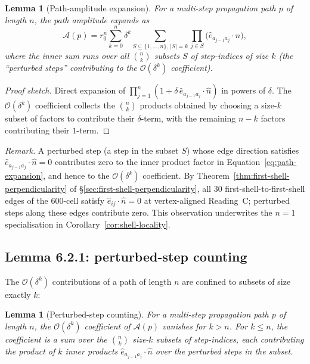 \documentclass[11pt,letterpaper]{article}
\newtheorem{lemma}[theorem]{Lemma}
\newcommand{\bigO}[1]{\mathcal{O}(#1)}
\begin{document}
\begin{lemma}[Path-amplitude expansion]
\label{lem:path-expansion}
For a multi-step propagation path $p$ of length $n$, the path amplitude expands as
\begin{equation}
\mathcal{A}(p) = r_0^n \sum_{k=0}^{n} \delta^k \sum_{S \subseteq \{1, \ldots, n\}, \, |S| = k} \prod_{j \in S} \big(\hat{e}_{a_{j-1} a_j} \cdot \hat{n}\big),
\label{eq:path-expansion}
\end{equation}
where the inner sum runs over all $\binom{n}{k}$ subsets $S$ of step-indices of size $k$ (the ``perturbed steps'' contributing to the $\bigO{\delta^k}$ coefficient).
\end{lemma}

\begin{proof}[Proof sketch]
Direct expansion of $\prod_{j=1}^{n} (1 + \delta \, \hat{e}_{a_{j-1} a_j} \cdot \hat{n})$ in powers of $\delta$. The $\bigO{\delta^k}$ coefficient collects the $\binom{n}{k}$ products obtained by choosing a size-$k$ subset of factors to contribute their $\delta$-term, with the remaining $n - k$ factors contributing their $1$-term.
\end{proof}

\emph{Remark.} A perturbed step (a step in the subset $S$) whose edge direction satisfies $\hat{e}_{a_{j-1} a_j} \cdot \hat{n} = 0$ contributes zero to the inner product factor in Equation~\eqref{eq:path-expansion}, and hence to the $\bigO{\delta^k}$ coefficient. By Theorem~\ref{thm:first-shell-perpendicularity} of \S\ref{sec:first-shell-perpendicularity}, all 30 first-shell-to-first-shell edges of the 600-cell satisfy $\hat{e}_{ij} \cdot \hat{n} = 0$ at vertex-aligned Reading~C; perturbed steps along these edges contribute zero. This observation underwrites the $n=1$ specialisation in Corollary~\ref{cor:shell-locality}.

\subsection{Lemma 6.2.1: perturbed-step counting}
\label{sec:perturbed-step-counting}

The $\bigO{\delta^k}$ contributions of a path of length $n$ are confined to subsets of size exactly $k$:

\begin{lemma}[Perturbed-step counting]
\label{lem:perturbed-step-counting}
For a multi-step propagation path $p$ of length $n$, the $\bigO{\delta^k}$ coefficient of $\mathcal{A}(p)$ vanishes for $k > n$. For $k \le n$, the coefficient is a sum over the $\binom{n}{k}$ size-$k$ subsets of step-indices, each contributing the product of $k$ inner products $\hat{e}_{a_{j-1} a_j} \cdot \hat{n}$ over the perturbed steps in the subset.
\end{lemma}
\end{document}
